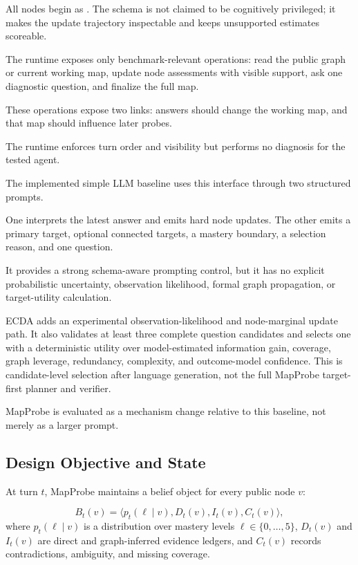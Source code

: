 All nodes begin as \unknown. The schema is not claimed to be cognitively privileged; it makes the
update trajectory inspectable and keeps unsupported estimates scoreable.

The runtime exposes only benchmark-relevant operations: read the public graph or current working map,
update node assessments with visible support, ask one diagnostic question, and finalize the full map.

These operations expose two links: answers should change the working map, and that map should influence
later probes.

The runtime enforces turn order and visibility but performs no diagnosis for the tested agent.

The implemented simple LLM baseline uses this interface through two structured prompts.

One interprets the latest answer and emits hard node updates. The other emits a primary target, optional
connected targets, a mastery boundary, a selection reason, and one question.

It provides a strong schema-aware prompting control, but it has no explicit probabilistic uncertainty,
observation likelihood, formal graph propagation, or target-utility calculation.

ECDA adds an experimental observation-likelihood and node-marginal update path. It also validates at
least three complete question candidates and selects one with a deterministic utility over
model-estimated information gain, coverage, graph leverage, redundancy, complexity, and outcome-model
confidence. This is candidate-level selection after language generation, not the full MapProbe
target-first planner and verifier.

MapProbe is evaluated as a mechanism change relative to this baseline, not merely as a larger prompt.

\subsection{Design Objective and State}

At turn $t$, MapProbe maintains a belief object for every public node $v$:

\begin{equation}
    B_t(v) = \langle p_t(\ell\mid v), D_t(v), I_t(v), C_t(v) \rangle,
\end{equation}
where $p_t(\ell\mid v)$ is a distribution over mastery levels $\ell\in\{0,\ldots,5\}$,
$D_t(v)$ and $I_t(v)$ are direct and graph-inferred evidence ledgers, and $C_t(v)$ records
contradictions, ambiguity, and missing coverage.

